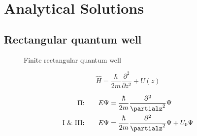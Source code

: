 \section{Analytical Solutions}
	\subsection{Rectangular quantum well}
		\begin{figure}[!h]
			\centering
			
			\caption{Finite rectangular quantum well}
		\end{figure}
		
		\begin{equation}
			\hat{H} = \frac{\hbar}{2m} \frac{\partial^2}{\partial z^2} + U(z)
		\end{equation}
		
		\begin{align}
			\text{II:}&\qquad E\Psi = \frac{\hbar}{2m} \frac{\partial^2}{\partialz^2}\Psi \\
			\text{I \& III:}& \qquad E\Psi = \frac{\hbar}{2m} \frac{\partial^2}{\partialz^2}\Psi + U_0\Psi
		\end{align}
		
